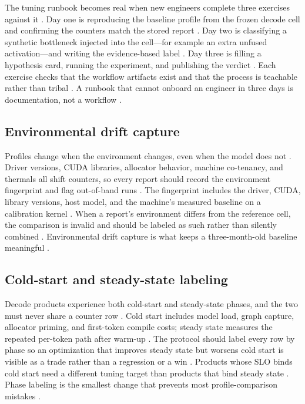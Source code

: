 The tuning runbook becomes real when new engineers complete three exercises against it \citep{chen2020compilerbasedhardw,memoryfloor2026,taxbreak2026}. Day one is reproducing the baseline profile from the frozen decode cell and confirming the counters match the stored report \citep{patel2025llminference,memoryfloor2026}. Day two is classifying a synthetic bottleneck injected into the cell—for example an extra unfused activation—and writing the evidence-based label \citep{chen2020compilerbasedhardw,patel2025llminference}. Day three is filling a hypothesis card, running the experiment, and publishing the verdict \citep{memoryfloor2026,taxbreak2026}. Each exercise checks that the workflow artifacts exist and that the process is teachable rather than tribal \citep{chen2020compilerbasedhardw,patel2025llminference}. A runbook that cannot onboard an engineer in three days is documentation, not a workflow \citep{memoryfloor2026,taxbreak2026}.

\subsection{Environmental drift capture}

Profiles change when the environment changes, even when the model does not \citep{chen2020compilerbasedhardw,memoryfloor2026,patel2025llminference}. Driver versions, CUDA libraries, allocator behavior, machine co-tenancy, and thermals all shift counters, so every report should record the environment fingerprint and flag out-of-band runs \citep{taxbreak2026,memoryfloor2026}. The fingerprint includes the driver, CUDA, library versions, host model, and the machine's measured baseline on a calibration kernel \citep{chen2020compilerbasedhardw,patel2025llminference}. When a report's environment differs from the reference cell, the comparison is invalid and should be labeled as such rather than silently combined \citep{memoryfloor2026,taxbreak2026}. Environmental drift capture is what keeps a three-month-old baseline meaningful \citep{patel2025llminference,memoryfloor2026}.

\subsection{Cold-start and steady-state labeling}

Decode products experience both cold-start and steady-state phases, and the two must never share a counter row \citep{patel2025llminference,kwon2023vllm,taxbreak2026}. Cold start includes model load, graph capture, allocator priming, and first-token compile costs; steady state measures the repeated per-token path after warm-up \citep{nvidia2024cudagraphs,memoryfloor2026}. The protocol should label every row by phase so an optimization that improves steady state but worsens cold start is visible as a trade rather than a regression or a win \citep{chen2020compilerbasedhardw,patel2025llminference}. Products whose SLO binds cold start need a different tuning target than products that bind steady state \citep{kwon2023vllm,taxbreak2026}. Phase labeling is the smallest change that prevents most profile-comparison mistakes \citep{memoryfloor2026,patel2025llminference}.

